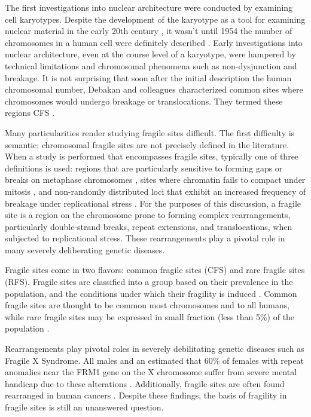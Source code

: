 The first investigations into nuclear architecture were conducted by examining cell karyotypes.  Despite the development of the karyotype as a
tool for examining nuclear material in the early 20th century \citep{levitsky1924}, it wasn't until 1954 the number of chromosomes in a human
cell were definitely described \citep{tjio1956}.  Early investigations into nuclear architecture, even at the course level of a karyotype, were
hampered by technical limitations and chromosomal phenomena such as non-dysjunction and breakage.  It is not surprising that soon after the
initial description the human chromosomal number, Debakan and colleagues characterized common sites where chromosomes would undergo breakage or
translocations.  They termed these regions \gls{CFS} \citep{leyden2008}.

Many particularities render studying fragile sites difficult.  The first difficulty is semantic; chromosomal fragile sites are not precisely
defined in the literature.  When a study is performed that encompasses fragile sites, typically one of three definitions is used: regions
that are particularly sensitive to forming gaps or breaks on metaphase chromosomes \citep{glover2005}, sites where chromatin fails to compact
under mitosis \citep{leyden2008}, and non-randomly distributed loci that exhibit an increased frequency of breakage under replicational
stress \citep{franchitto2013}.  For the purposes of this discussion, a \gls{fragile site} is a region on the chromosome prone to
forming complex rearrangements, particularly double-strand breaks, repeat extensions, and translocations, when subjected to replicational stress.
These rearrangements play a pivotal role in many severely deliberating genetic diseases.

Fragile sites come in two flavors: common fragile sites (CFS) and rare fragile sites (RFS).  Fragile sites are classified into a group based on their
prevalence in the population, and the conditions under which their fragility is induced \citep{leyden2008}.  Common fragile sites are thought to be common
most chromosomes and to all humans, while rare fragile sites may be expressed in small fraction (less than 5\%) of the population \citep{wells2006}.

Rearrangements play pivotal roles in severely debilitating genetic diseases such as Fragile X Syndrome.  All males and an estimated that 60\% of females
with repeat anomalies near the FRM1 gene on the X chromosome suffer from severe mental handicap due to these alterations \citep{sutherland1995}. Additionally,
fragile sites are often found rearranged in human cancers \citep{glover2005}.  Despite these findings, the basis of fragility in fragile sites is still an
unanswered question.
